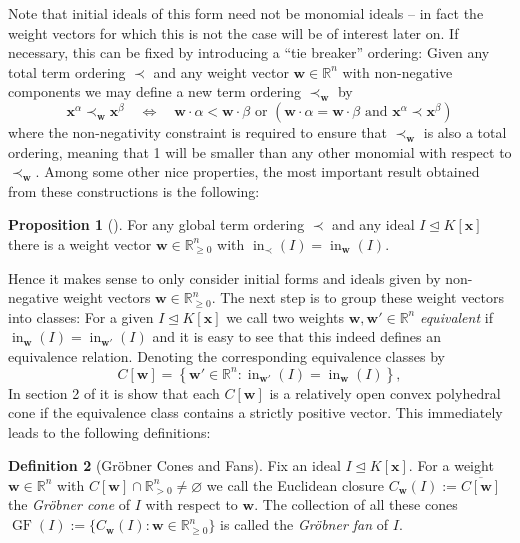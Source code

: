 \documentclass[
  paper=a4,
  titlepage,
  bibliography=totoc,
  listof=totoc,
  pagesize=pdftex
]{scrartcl}
\numberwithin{figure}{section}
\numberwithin{equation}{section}
\numberwithin{table}{section}
\newcommand*\setR{\mathds{R}}
\let\vec\mathbf
\let\idealof\trianglelefteq
\DeclareMathOperator{\initial}{in}
\DeclareMathOperator{\GF}{GF}
\theoremstyle{definition}
\newtheorem{definition}{Definition}
\newtheorem{proposition}[definition]{Proposition}
\numberwithin{definition}{section}
\begin{document}
Note that initial ideals of this form need not be monomial ideals -- in fact the weight
vectors for which this is not the case will be of interest later on. If necessary, this
can be fixed by introducing a \enquote{tie breaker} ordering: Given any total term
ordering $\prec$ and any weight vector $\vec w\in\setR^n$ with non-negative components we
may define a new term ordering $\prec_{\vec w}$ by
\[
  \vec x^\alpha \prec_{\vec w} \vec x^\beta
  \quad\iff\quad
  \vec w \cdot \alpha < \vec w\cdot \beta
  \text{ or }
  \left(
    \vec w \cdot \alpha = \vec w\cdot \beta
    \text{ and }
    \vec x^\alpha \prec \vec x^\beta
  \right)
\]
where the non-negativity constraint is required to ensure that $\prec_{\vec w}$ is also a
total ordering, meaning that 1 will be smaller than any other monomial with respect to
$\prec_{\vec w}$. Among some other nice properties, the most important result obtained
from these constructions is the following:

\begin{proposition}[{\cite[Proposition~1.11]{SturmGBCP}}]
  \label{prp:init}
  For any global term ordering $\prec$ and any ideal $I \idealof K[\vec x]$ there is a
  weight vector $\vec w \in \setR^n_{\geq0}$ with $\initial_\prec(I) = \initial_{\vec
  w}(I)$.
\end{proposition}

Hence it makes sense to only consider initial forms and ideals given by non-negative
weight vectors $\vec w \in \setR^n_{\geq0}$. The next step is to group these weight
vectors into classes: For a given $I \idealof K[\vec x]$ we call two weights $\vec w, \vec
w' \in \setR^n$ \emph{equivalent} if $\initial_{\vec w}(I) = \initial_{\vec w'}(I)$ and it
is easy to see that this indeed defines an equivalence relation. Denoting the
corresponding equivalence classes by
\[
  C[\vec w] = \left\{
    \vec w' \in \setR^n : \initial_{\vec w'}(I) = \initial_{\vec w}(I)
  \right\},
\]
In section 2 of \cite{compGrobFan} it is show that each $C[\vec w]$ is a relatively open
convex polyhedral cone if the equivalence class contains a strictly positive vector. This
immediately leads to the following definitions:

\begin{definition}[Gröbner Cones and Fans]
  \label{def:groebnerConeFan}
  Fix an ideal $I \idealof K[\vec x]$. For a weight $\vec w \in \setR^n$ with $C[\vec w]
  \cap \setR^n_{>0} \neq \varnothing$ we call the Euclidean closure $C_{\vec w}(I) :=
  \overline{C[\vec w]}$ the \emph{Gröbner cone} of $I$ with respect to $\vec w$. The
  collection of all these cones $\GF(I) := \{ C_{\vec w}(I) : \vec w \in \setR^n_{\geq0}
  \}$ is called the \emph{Gröbner fan} of $I$.
\end{definition}
\end{document}
